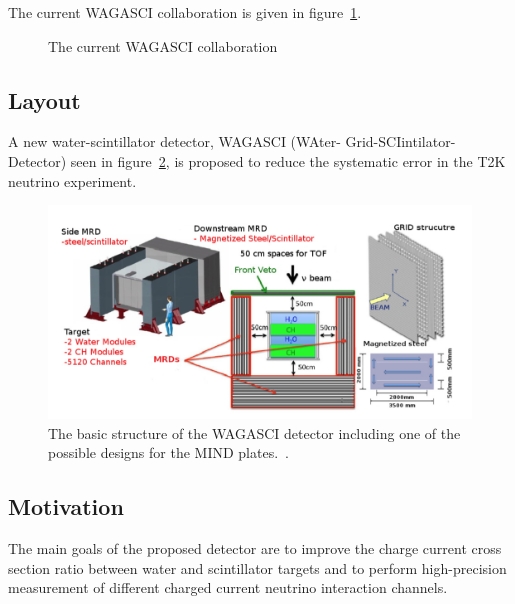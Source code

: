 The current WAGASCI collaboration is given in figure~\ref{fig:collaborationW}.
\begin{figure}[h!]
\centering
{}
\caption{The current WAGASCI collaboration}
\label{fig:collaborationW}
\end{figure}

\subsection{Layout}
A new water-scintillator detector, WAGASCI (WAter- Grid-SCIintilator-Detector) seen in figure~\ref{fig:WAGASCI}, is proposed to reduce the systematic error in the T2K neutrino experiment.

\begin{figure}[h!]
\centering
\includegraphics[width=\textwidth]{figures/WAGASCI.png}
\caption{The basic structure of the WAGASCI detector including one of the possible designs for the MIND plates.~\cite{30WAGASCI}.}
\label{fig:WAGASCI}
\end{figure}

\subsection{Motivation}
The main goals of the proposed detector are to improve the charge current cross section ratio between water and scintillator targets and to perform high-precision measurement of different charged current neutrino interaction channels.

\fi
